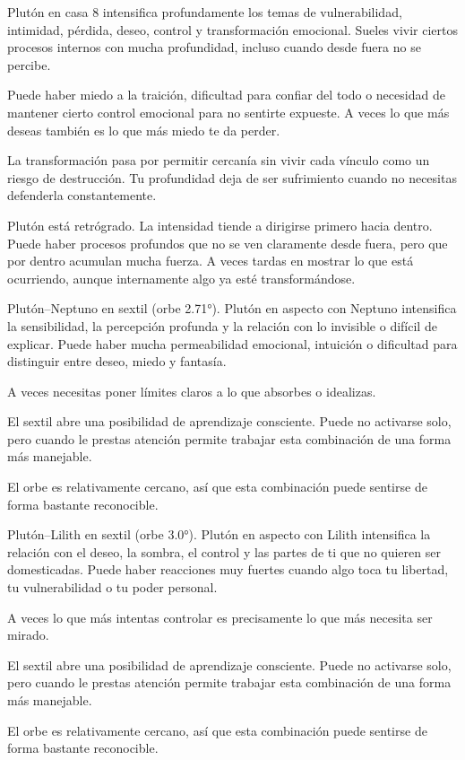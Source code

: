 \documentclass[11pt,a4paper]{article}
\begin{document}
Plutón en casa 8 intensifica profundamente los temas de vulnerabilidad, intimidad, pérdida, deseo, control y transformación emocional. Sueles vivir ciertos procesos internos con mucha profundidad, incluso cuando desde fuera no se percibe.

Puede haber miedo a la traición, dificultad para confiar del todo o necesidad de mantener cierto control emocional para no sentirte expueste. A veces lo que más deseas también es lo que más miedo te da perder.

La transformación pasa por permitir cercanía sin vivir cada vínculo como un riesgo de destrucción. Tu profundidad deja de ser sufrimiento cuando no necesitas defenderla constantemente.

Plutón está retrógrado. La intensidad tiende a dirigirse primero hacia dentro. Puede haber procesos profundos que no se ven claramente desde fuera, pero que por dentro acumulan mucha fuerza. A veces tardas en mostrar lo que está ocurriendo, aunque internamente algo ya esté transformándose.

Plutón–Neptuno en sextil (orbe 2.71°).
Plutón en aspecto con Neptuno intensifica la sensibilidad, la percepción profunda y la relación con lo invisible o difícil de explicar. Puede haber mucha permeabilidad emocional, intuición o dificultad para distinguir entre deseo, miedo y fantasía.

A veces necesitas poner límites claros a lo que absorbes o idealizas.

El sextil abre una posibilidad de aprendizaje consciente. Puede no activarse solo, pero cuando le prestas atención permite trabajar esta combinación de una forma más manejable.

El orbe es relativamente cercano, así que esta combinación puede sentirse de forma bastante reconocible.

Plutón–Lilith en sextil (orbe 3.0°).
Plutón en aspecto con Lilith intensifica la relación con el deseo, la sombra, el control y las partes de ti que no quieren ser domesticadas. Puede haber reacciones muy fuertes cuando algo toca tu libertad, tu vulnerabilidad o tu poder personal.

A veces lo que más intentas controlar es precisamente lo que más necesita ser mirado.

El sextil abre una posibilidad de aprendizaje consciente. Puede no activarse solo, pero cuando le prestas atención permite trabajar esta combinación de una forma más manejable.

El orbe es relativamente cercano, así que esta combinación puede sentirse de forma bastante reconocible.
\end{document}
